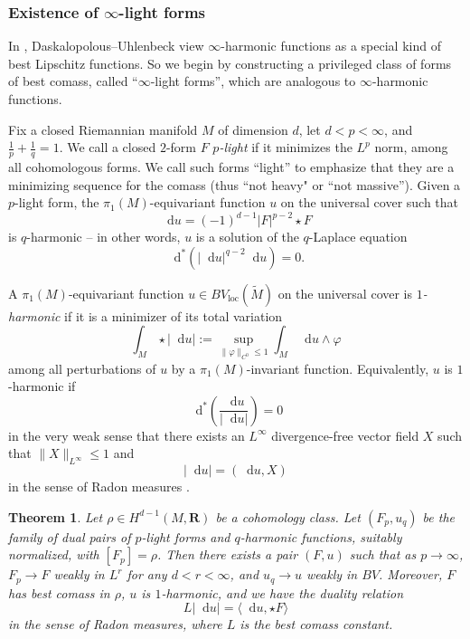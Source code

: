 \documentclass[reqno,11pt]{amsart}
\newcommand{\RR}{\mathbf{R}}
\newcommand*\dif{\mathop{}\!\mathrm{d}}
\newcommand{\dfn}[1]{\emph{#1}\index{#1}}
\newcommand{\loc}{\mathrm{loc}}
\newtheorem{mainthm}{Theorem}
\theoremstyle{definition}
\numberwithin{equation}{section}
\begin{document}
\subsubsection{Existence of $\infty$-light forms}
In \cite{daskalopoulos2020transverse}, Daskalopolous--Uhlenbeck view $\infty$-harmonic functions as a special kind of best Lipschitz functions.
So we begin by constructing a privileged class of forms of best comass, called ``$\infty$-light forms'', which are analogous to $\infty$-harmonic functions.

Fix a closed Riemannian manifold $M$ of dimension $d$, let $d < p < \infty$, and $\frac{1}{p} + \frac{1}{q} = 1$.
We call a closed $2$-form $F$ \dfn{$p$-light} if it minimizes the $L^p$ norm, among all cohomologous forms.
We call such forms ``light'' to emphasize that they are a minimizing sequence for the comass (thus ``not heavy" or ``not massive'').
Given a $p$-light form, the $\pi_1(M)$-equivariant function $u$ on the universal cover such that
$$\dif u = (-1)^{d - 1} |F|^{p - 2} \star F$$
is $q$-harmonic -- in other words, $u$ is a solution of the $q$-Laplace equation 
$$\dif^*(|\dif u|^{q - 2} \dif u) = 0.$$

A $\pi_1(M)$-equivariant function $u \in BV_\loc(\tilde M)$ on the universal cover is \dfn{$1$-harmonic} if it is a minimizer of its total variation 
$$\int_M \star |\dif u| := \sup_{\|\varphi\|_{C^0} \leq 1} \int_M \dif u \wedge \varphi$$
among all perturbations of $u$ by a $\pi_1(M)$-invariant function.
Equivalently, $u$ is $1$-harmonic if 
$$\dif^* \left(\frac{\dif u}{|\dif u|}\right) = 0$$
in the very weak sense that there exists an $L^\infty$ divergence-free vector field $X$ such that $\|X\|_{L^\infty} \leq 1$ and
$$|\dif u| = (\dif u, X)$$
in the sense of Radon measures \cite{Mazon14}.

\begin{mainthm}\label{existence of infinity light forms}
Let $\rho \in H^{d - 1}(M, \RR)$ be a cohomology class.
Let $(F_p, u_q)$ be the family of dual pairs of $p$-light forms and $q$-harmonic functions, suitably normalized, with $[F_p] = \rho$.
Then there exists a pair $(F, u)$ such that as $p \to \infty$, $F_p \to F$ weakly in $L^r$ for any $d < r < \infty$, and $u_q \to u$ weakly in $BV$.
Moreover, $F$ has best comass in $\rho$, $u$ is $1$-harmonic, and we have the duality relation 
\begin{equation}\label{max flow mean cut}
L|\dif u| = \langle \dif u, \star F\rangle
\end{equation}
in the sense of Radon measures, where $L$ is the best comass constant.
\end{mainthm}
\end{document}
